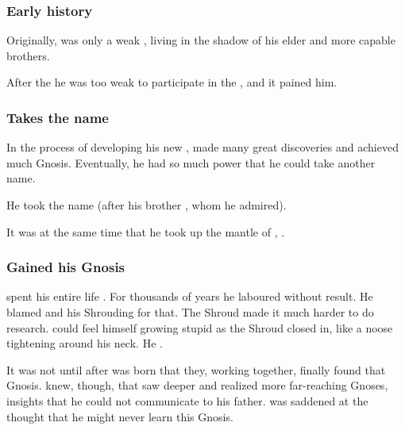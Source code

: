 \subsubsection{Early history}
Originally, \HriistD{} was only a weak \vertex, living in the shadow of his elder and more capable brothers. 

After the  he was too weak to participate in the , and it pained him. 





\subsubsection{Takes the name \Nexagglachel}
In the process of developing his new , \Secherdamon made many great discoveries and achieved much Gnosis.
Eventually, he had so much power that he could take another name. 

He took the name {\quo{\Nexagglachel}} (after his brother , whom he admired). 

It was at the same time that he took up the mantle of \quo{\RissitNechsain}, . 





\subsubsection{Gained his Gnosis}
\Secherdamon{} spent his entire life . 
For thousands of years he laboured without result. 
He blamed \Ishnaruchaefir{} and his Shrouding for that. 
The Shroud made it much harder to do research. 
\Secherdamon{} could feel himself growing stupid as the Shroud closed in, like a noose tightening around his neck. 
He . 

It was not until after  was born that they, working together, finally found that Gnosis. 
\Secherdamon{} knew, though, that \Vizsherioch{} saw deeper and realized more far-reaching Gnoses, insights that he could not communicate to his father. 
\Secherdamon{} was saddened at the thought that he might never learn this Gnosis. 





